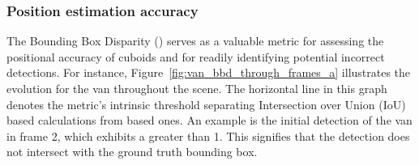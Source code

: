 \subsubsection{Position estimation accuracy}
The Bounding Box Disparity () serves as a valuable metric for assessing the positional accuracy of cuboids and for readily identifying potential incorrect detections. For instance, Figure~\ref{fig:van_bbd_through_frames_a} illustrates the  evolution for the van throughout the scene. The horizontal line in this graph denotes the  metric's intrinsic threshold separating Intersection over Union (IoU) based calculations from  based ones. An example is the initial detection of the van in frame 2, which exhibits a  greater than 1. This signifies that the detection does not intersect with the ground truth bounding box. 

